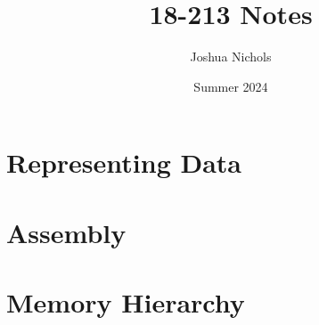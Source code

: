 \documentclass[12pt]{article}
\author{Joshua Nichols}
\date{Summer 2024}
\title{18-213 Notes}
\begin{document}
\maketitle

\tableofcontents

\pagebreak
\section{Representing Data}

\pagebreak
\section{Assembly}

\pagebreak
\section{Memory Hierarchy}

\pagebreak

\end{document}
